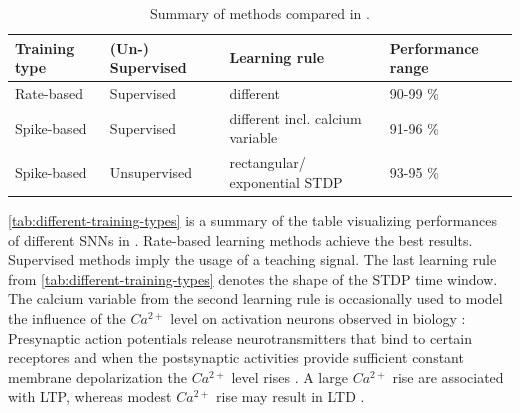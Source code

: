 \begin{table}[]
    \begin{tabular}{|l|l|l|l|}
    \hline
    \textbf{Training type} & \textbf{(Un-) Supervised}    & \textbf{Learning rule}               & \textbf{Performance range} \\ \hline
    Rate-based             & Supervised                   & different                            & 90-99 \%                   \\ \hline
    Spike-based            & Supervised                   & different incl. calcium variable & 91-96 \%                   \\ \hline
    Spike-based            & Unsupervised                 & rectangular/ exponential \ac{STDP}        & 93-95 \%                   \\ \hline
    \end{tabular}
    \caption{Summary of methods compared in \cite{SNN}.}
    \label{tab:different-training-types}
\end{table}

\autoref{tab:different-training-types} is a summary of the table visualizing performances of different \acp{SNN} in \cite{SNN}.
Rate-based learning methods achieve the best results.
Supervised methods imply the usage of a teaching signal.
The last learning rule from \autoref{tab:different-training-types} denotes the shape of the \ac{STDP} time window.
The calcium variable from the second learning rule is occasionally used to model the influence of the $Ca^{2+}$ level on activation neurons observed in biology \cite{STDP_hebbian}:
Presynaptic action potentials release neurotransmitters that bind to certain receptores and 
when the postsynaptic activities provide sufficient constant membrane depolarization the $Ca^{2+}$ level rises \cite{Synaptic_plasticity}.
A large $Ca^{2+}$ rise are associated with \ac{LTP}, whereas modest $Ca^{2+}$ rise may result in \ac{LTD} \cite{STDP_hebbian}.